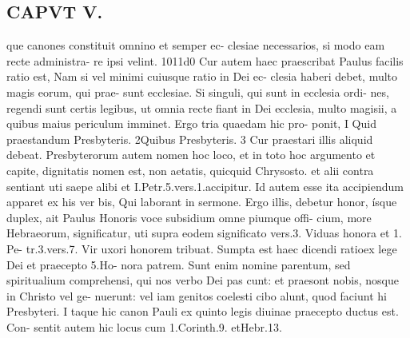 \documentclass{article}
\begin{document}
\begin{pages}
\section*{CAPVT  V. }que canones constituit omnino et semper ec- clesiae necessarios, si modo eam recte administra- re ipsi velint. 1011d0 Cur autem haec praescribat Paulus facilis ratio est, Nam si vel minimi cuiusque ratio in Dei ec- clesia haberi debet, multo magis eorum, qui prae- sunt ecclesiae. Si singuli, qui sunt in ecclesia ordi- nes, regendi sunt certis legibus, ut omnia recte fiant in Dei ecclesia, multo magisii, a quibus maius periculum imminet. Ergo tria quaedam hic pro- ponit, I Quid praestandum Presbyteris. 2Quibus Presbyteris. 3 Cur praestari illis aliquid debeat. Presbyterorum autem nomen hoc loco, et in toto hoc argumento et capite, dignitatis nomen est, non aetatis, quicquid Chrysosto. et alii contra sentiant uti saepe alibi et I.Petr.5.vers.1.accipitur. Id autem esse ita accipiendum apparet ex his ver bis, Qui laborant in sermone. Ergo illis, debetur honor, ísque duplex, ait Paulus Honoris voce subsidium omne piumque offi- cium, more Hebraeorum, significatur, uti supra eodem significato vers.3. Viduas honora et 1. Pe- tr.3.vers.7. Vir uxori honorem tribuat. Sumpta est haec dicendi ratioex lege Dei et praecepto 5.Ho- nora patrem. Sunt enim nomine parentum, sed spiritualium comprehensi, qui nos verbo Dei pas cunt: et praesont nobis, nosque in Christo vel ge- nuerunt: vel iam genitos coelesti cibo alunt, quod faciunt hi Presbyteri. I taque hic canon Pauli ex quinto legis diuinae praecepto ductus est. Con- sentit autem hic locus cum 1.Corinth.9. etHebr.13. 

\end{pages}
\end{document}
